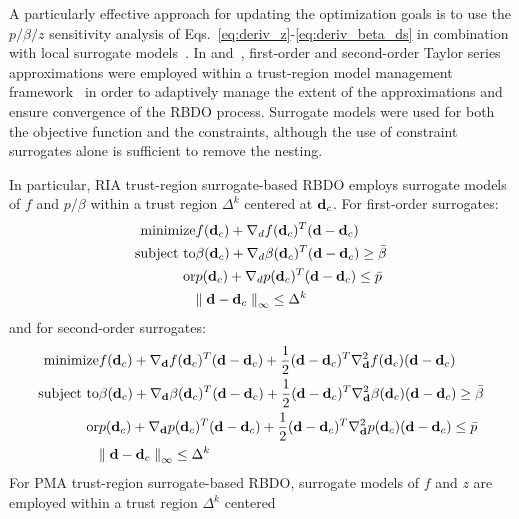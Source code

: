 A particularly effective approach for updating the optimization goals
is to use the $p/\beta/z$ sensitivity analysis of
Eqs.~\ref{eq:deriv_z}-\ref{eq:deriv_beta_ds} in combination with local
surrogate models~\cite{Zou04}.  In \cite{Eld05} and~\cite{Eld06a},
first-order and second-order Taylor series approximations were
employed within a trust-region model management framework~\cite{Giu00}
in order to adaptively manage the extent of the approximations and
ensure convergence of the RBDO process.  Surrogate models were used
for both the objective function and the constraints, although the use
of constraint surrogates alone is sufficient to remove the nesting.

In particular, RIA trust-region surrogate-based RBDO employs surrogate
models of $f$ and $p/\beta$ within a trust region $\Delta^k$ centered
at ${\bf d}_c$.  For first-order surrogates:
\begin{eqnarray}
  {\rm minimize }     & f({\bf d}_c) + \nabla_d f({\bf d}_c)^T
({\bf d} - {\bf d}_c) \nonumber \\
  {\rm subject \ to } & \beta({\bf d}_c) + \nabla_d \beta({\bf d}_c)^T
({\bf d} - {\bf d}_c) \ge \bar{\beta} \nonumber \\
  {\rm or }           & p ({\bf d}_c) + \nabla_d p({\bf d}_c)^T 
({\bf d} - {\bf d}_c) \le \bar{p} \nonumber \\
& {\parallel {\bf d} - {\bf d}_c \parallel}_\infty \le \Delta^k
\label{eq:rbdo_surr1_ria}
\end{eqnarray}
and for second-order surrogates:
\begin{eqnarray}
  {\rm minimize }     & f({\bf d}_c) + \nabla_{\bf d} f({\bf d}_c)^T
({\bf d} - {\bf d}_c)  + \frac{1}{2} ({\bf d} - {\bf d}_c)^T 
\nabla^2_{\bf d} f({\bf d}_c) ({\bf d} - {\bf d}_c) \nonumber \\
  {\rm subject \ to } & \beta({\bf d}_c) + \nabla_{\bf d} \beta({\bf d}_c)^T
({\bf d} - {\bf d}_c) + \frac{1}{2} ({\bf d} - {\bf d}_c)^T 
\nabla^2_{\bf d} \beta({\bf d}_c) ({\bf d} - {\bf d}_c) \ge \bar{\beta}
\nonumber \\
  {\rm or }           & p ({\bf d}_c) + \nabla_{\bf d} p({\bf d}_c)^T 
({\bf d} - {\bf d}_c) + \frac{1}{2} ({\bf d} - {\bf d}_c)^T 
\nabla^2_{\bf d} p({\bf d}_c) ({\bf d} - {\bf d}_c) \le \bar{p} \nonumber \\
& {\parallel {\bf d} - {\bf d}_c \parallel}_\infty \le \Delta^k
\label{eq:rbdo_surr2_ria}
\end{eqnarray}
For PMA trust-region surrogate-based RBDO, surrogate models of
$f$ and $z$ are employed within a trust region $\Delta^k$ centered 
